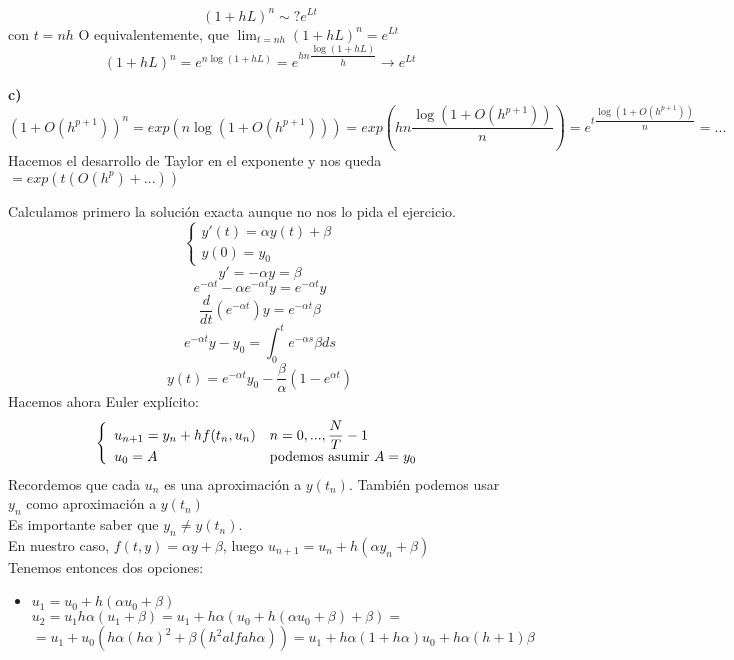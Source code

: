 \documentclass[openany]{book}
\begin{document}
    \setcounter{ex}{2}
    $$ (1+hL)^{n} \sim? e ^{Lt} $$
    con $ t = nh $
    O equivalentemente, que $ \lim_{t = nh} (1+hL)^{n} = e^{Lt}$
    $$ (1+hL)^{n} = e^{n \log(1+hL)} = e^{hn \dfrac{\log(1+hL)}{h}} \to e^{Lt} $$
    
    \textbf{c)}\\
    $$ (1+O(h^{p+1}))^{n} = exp(n \log(1+O(h ^{p+1}))) = exp(hn \dfrac{\log(1+O(h^{p+1}))}{n}) = e ^{t \dfrac{\log(1+O(h^{p+1}))}{n}} = ...$$
    Hacemos el desarrollo de Taylor en el exponente y nos queda $  = exp(t(O(h^{p})+...)) $
    
    \setcounter{ex}{9}
    
    \begin{exercise}
        Calculamos primero la solución exacta aunque no nos lo pida el ejercicio.
        $$ \left\{
        \begin{array}{l}
            y'(t) = \alpha y(t)+\beta\\
            y(0) = y_0
        \end{array}
        \right. $$
        $$ y' = -\alpha y = \beta $$
        $$ e^{-\alpha t}- \alpha e ^{-\alpha t} y = e ^{-\alpha t}y $$
        $$  \dfrac{d}{dt}(e^{-\alpha t }) y = e^{-\alpha t}\beta  $$
        $$ e^{-\alpha t}y -y_0 = \int_{0}^{t}e^{-\alpha s} \beta ds $$
        $$ y(t) = e^{-\alpha t} y_0 - \dfrac{\beta}{\alpha}(1-e^{\alpha t}) $$
        Hacemos ahora Euler explícito:
        $$ \left\{
        \begin{array}{ll}
            u_{n+1} = y_n +h f(t_n,u_n) & n=0,...,\dfrac{N}{T}-1\\
            u_0 = A & \text{podemos asumir $ A = y_0 $}
        \end{array}
        \right. $$
        Recordemos que cada $ u_n $ es una aproximación a $ y(t_n) $.
        También podemos usar $ y_n $ como aproximación a $ y(t_n) $\\
        Es importante saber que $ y_n \ne y(t_n) $.\\
        En nuestro caso, $ f(t,y) = \alpha y +\beta $, luego $ u_{n+1} = u_n+h(\alpha y_n+\beta) $\\
        Tenemos entonces dos opciones:
        \begin{itemize}
            \item $ u_1=u_0+h(\alpha u_0+\beta) $\\
            $ u_2 =  u_1h \alpha( u_1+\beta) = u_1+h \alpha(u_0+h(\alpha u_0+\beta)+\beta) = $\\$ = u_1 + u_0 (h \alpha(h \alpha)^2+\beta (h^2alfa h \alpha)) = u_1 +h \alpha (1+h \alpha ) u_0+h \alpha (h+1) \beta$

\end{itemize}
\end{exercise}
\end{document}
